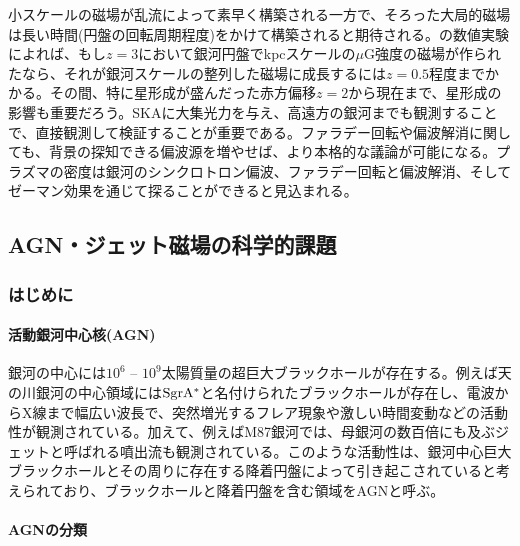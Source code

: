 小スケールの磁場が乱流によって素早く構築される一方で\citep{2012PhRvE..85b6303S}、そろった大局的磁場は長い時間(円盤の回転周期程度)をかけて構築されると期待される\citep{2005PhR...417....1B}。\cite{2009A&A...494...21A}の数値実験によれば、もし$z=3$において銀河円盤でkpcスケールの$\mu$G強度の磁場が作られたなら、それが銀河スケールの整列した磁場に成長するには$z=0.5$程度までかかる。その間、特に星形成が盛んだった赤方偏移$z=2$から現在まで、星形成の影響も重要だろう。SKAに大集光力を与え、高遠方の銀河までも観測することで、直接観測して検証することが重要である。ファラデー回転や偏波解消に関しても、背景の探知できる偏波源を増やせば、より本格的な議論が可能になる。プラズマの密度は銀河のシンクロトロン偏波、ファラデー回転と偏波解消、そしてゼーマン効果を通じて探ることができると見込まれる。


\subsection{AGN・ジェット磁場の科学的課題}
\label{c06.s1.ss4}

\subsubsection{はじめに}
\label{c06.s1.ss4.sss1}

\paragraph{活動銀河中心核(AGN)}

銀河の中心には$10^6$ -- $10^9$太陽質量の超巨大ブラックホールが存在する。例えば天の川銀河の中心領域には${\rm Sgr A^{*}}$と名付けられたブラックホールが存在し、電波からX線まで幅広い波長で、突然増光するフレア現象や激しい時間変動などの活動性が観測されている。加えて、例えばM87銀河では、母銀河の数百倍にも及ぶジェットと呼ばれる噴出流も観測されている。このような活動性は、銀河中心巨大ブラックホールとその周りに存在する降着円盤によって引き起こされていると考えられており、ブラックホールと降着円盤を含む領域をAGNと呼ぶ。

\paragraph{AGNの分類}

